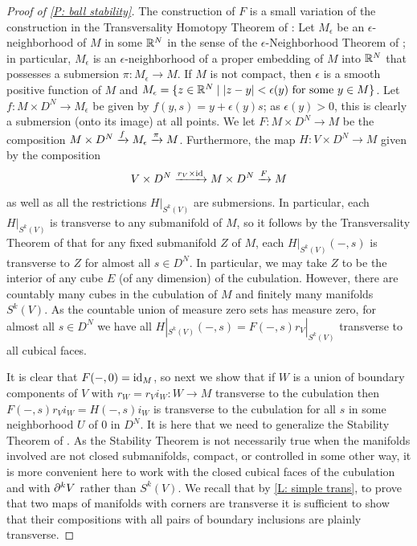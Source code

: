 \begin{proof}[Proof of \cref{P: ball stability}]
The construction of $F$ is a small variation of the construction in the Transversality Homotopy Theorem of \cite[Section 2.3]{GuPo74}:
Let $M_\epsilon$ be an $\epsilon$-neighborhood of $M$ in some $\mathbb{R}^N$ in the sense of the $\epsilon$-Neighborhood Theorem of \cite[Section 2.3]{GuPo74}; in particular,
$M_\epsilon$ is an $\epsilon$-neighborhood of a proper embedding of $M$ into $\mathbb{R}^N$ that possesses a submersion $\pi: M_\epsilon\to M$. If $M$ is not compact, then $\epsilon$ is a smooth positive function of $M$ and $M_\epsilon=\{z\in \mathbb{R}^N\mid |z-y|<\epsilon(y) \text{ for some }y\in M\}$. Let $f: M\times D^N\to M_\epsilon$ be given by $f(y, s)=y + \epsilon(y) s$; as $\epsilon(y)>0$, this is clearly a submersion (onto its image) at all points.
We let $F:M\times D^N\to M$ be the composition $M\times D^N\xrightarrow{f}M_\epsilon \xrightarrow{\pi}M$.
Furthermore, the map $H:V\times D^N\to M$ given by the composition $$V\times D^N\xrightarrow{r_V\times \mathrm{id}} M\times D^N\xrightarrow{F} M$$ as well as all the restrictions $H|_{S^k(V)}$
are submersions.
In particular, each $H|_{S^k(V)}$ is transverse to any submanifold of $M$, so it follows by the Transversality Theorem of \cite[Section 2.3]{GuPo74} that for any fixed submanifold $Z$ of $M$, each $H|_{S^k(V)}(-,s)$ is transverse to $Z$ for almost all $s\in D^N$. In particular, we may take $Z$ to be the interior of any cube $E$ (of any dimension) of the cubulation. However, there are countably many cubes in the cubulation of $M$ and finitely many manifolds $S^k(V)$. As the countable union of measure zero sets has measure zero, for almost all $s\in D^N$ we have all $H|_{S^k(V)}(-,s)=F(-,s)r_V|_{S^k(V)}$  transverse to all cubical faces.

It is clear that $F(-,0)=\mathrm{id}_M$, so next we show that if $W$ is a union of boundary components of $V$ with $r_W=r_Vi_W:W\to M$ transverse to the cubulation  then $F(-,s)r_Vi_W= H(-,s)i_W$ is transverse to the cubulation for all $s$ in some neighborhood $U$ of $0$ in $D^N$. It is here that we need to generalize the Stability Theorem of \cite[Section 1.6]{GuPo74}. As the Stability Theorem is not necessarily true when the manifolds involved are not closed submanifolds, compact, or controlled in some other way, it is more convenient here to work with the closed cubical faces of the cubulation and with $\partial^kV$ rather than $S^k(V)$. We recall that by \cref{L: simple trans}, to prove that two maps of manifolds with corners are transverse it is sufficient to show that their compositions with all pairs of boundary inclusions are plainly transverse.



\end{proof}
